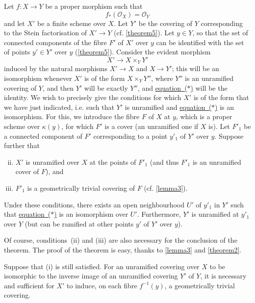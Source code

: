 \documentclass{article}
\theoremstyle{plain}
\newenvironment{theorem}[1]
  {\renewcommand\theinnercustomtheorem{#1}\innercustomtheorem}
  {\endinnercustomtheorem}
\newenvironment{corollary}[1]
  {\renewcommand\theinnercustomcorollary{#1}\innercustomcorollary}
  {\endinnercustomcorollary}
\theoremstyle{definition}
\newcommand{\sh}[1]{{\mathscr{#1}}}
\newcommand{\kres}{\kappa}
\newcommand{\oldpage}[1]{\marginpar{\footnotesize$\Big\vert$ \textit{p.~#1}}}
\begin{document}
Let $f\colon X\to Y$ be a proper morphism such that
\[
\label{equationi}
  f_*(\sh{O}_X) = \sh{O}_Y
\tag{i}
\]
and let $X'$ be a finite scheme over $X$.
Let $Y'$ be the covering of $Y$ corresponding to the Stein factorisation of $X'\to Y$ (cf. \cref{theorem5}).
Let $y\in Y$, so that the set of connected components of the fibre $F'$ of $X'$ over $y$ can be identified with the set of points $y'\in Y'$ over $y$ (\cref{theorem5}).
Consider the evident morphism
\[
\label{equation*}
  X'\to X\times_Y Y'
\tag{$*$}
\]
induced by the natural morphisms $X'\to X$ and $X\to Y'$;
this will be an isomorphism whenever $X'$ is of the form $X\times_Y Y''$, where $Y''$ is an unramified covering of $Y$, and then $Y'$ will be exactly $Y''$, and \hyperref[equation*]{equation~($*$)} will be the identity.
We wish to precisely give the conditions for which $X'$ is of the form that we have just indicated, i.e. such that $Y'$ is unramified and \hyperref[equation*]{equation~($*$)} is an isomorphism.
For this, we introduce the fibre $F$ of $X$ at $y$, which is a proper scheme over $\kres(y)$, for which $F'$ is a cover (an unramified one if $X$ is).
Let $F'_1$ be a connected component of $F'$ corresponding to a point $y'_1$ of $Y'$ over $y$.
Suppose further that
\begin{enumerate}[(i)]
\setcounter{enumi}{1}
  \item $X'$ is unramified over $X$ at the points of $F'_1$ (and thus $F'_1$ is an unramified cover of $F$), and
  \item $F'_1$ is a geometrically trivial covering of $F$ (cf. \cref{lemma3}).
\end{enumerate}

\begin{theorem}{11}
\label{theorem11}
  Under these conditions, there exists an open neighbourhood $U'$ of $y'_1$
\oldpage{182-22}
  in $Y'$ such that \hyperref[equation*]{equation~($*$)} is an isomorphism over $U'$.
  Furthermore, $Y'$ is unramified at $y'_1$ over $Y$ (but can be ramified at other points $y'$ of $Y'$ over $y$).
\end{theorem}

Of course, conditions~(ii) and (iii) are also necessary for the conclusion of the theorem.
The proof of the theorem is easy, thanks to \cref{lemma3} and \cref{theorem2}.

\begin{corollary}{1}
\label{theorem11corollary1}
  Suppose that (i) is still satisfied.
  For an unramified covering over $X$ to be isomorphic to the inverse image of an unramified covering $Y'$ of $Y$, it is necessary and sufficient for $X'$ to induce, on each fibre $f^{-1}(y)$, a geometrically trivial covering.
\end{corollary}
\end{document}
